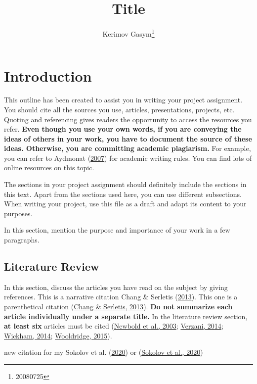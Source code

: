 \documentclass[
  12pt,
]{article}
\title{Title}
\author{Kerimov Gasym\footnote{20080725}}
\date{}
\begin{document}
\maketitle

\hypertarget{introduction}{%
\section{Introduction}\label{introduction}}

This outline has been created to assist you in writing your project assignment. You should cite all the sources you use, articles, presentations, projects, etc. Quoting and referencing gives readers the opportunity to access the resources you refer. \textbf{Even though you use your own words, if you are conveying the ideas of others in your work, you have to document the source of these ideas. Otherwise, you are committing academic plagiarism.} For example, you can refer to Aydınonat (\protect\hyperlink{ref-aydinonat:2007}{2007}) for academic writing rules. You can find lots of online resources on this topic.

The sections in your project assignment should definitely include the sections in this text. Apart from the sections used here, you can use different subsections. When writing your project, use this file as a draft and adapt its content to your purposes.

In this section, mention the purpose and importance of your work in a few paragraphs.

\hypertarget{literature-review}{%
\subsection{Literature Review}\label{literature-review}}

In this section, discuss the articles you have read on the subject by giving references. This is a narrative citation Chang \& Serletis (\protect\hyperlink{ref-chang:2013}{2013}). This one is a parenthetical citation (\protect\hyperlink{ref-chang:2013}{Chang \& Serletis, 2013}). \textbf{Do not summarize each article individually under a separate title.} In the literature review section, \textbf{at least six} articles must be cited (\protect\hyperlink{ref-newbold:2003}{Newbold et al., 2003}; \protect\hyperlink{ref-verzani:2014}{Verzani, 2014}; \protect\hyperlink{ref-wickham:2014}{Wickham, 2014}; \protect\hyperlink{ref-wooldridge:2015a}{Wooldridge, 2015}).

new citation for my Sokolov et al. (\protect\hyperlink{ref-sokolov2020complex}{2020}) or (\protect\hyperlink{ref-sokolov2020complex}{Sokolov et al., 2020})
\end{document}
